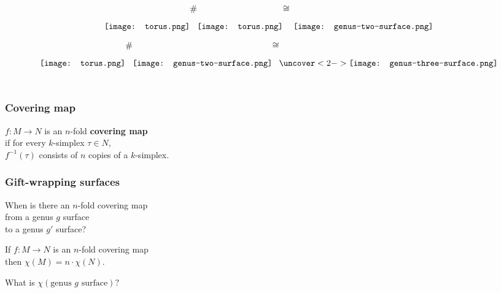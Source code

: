 \documentclass[14pt]{beamer}
\DeclareMathOperator{\st}{st}
\DeclareMathOperator{\cl}{cl}
\begin{document}
\begin{frame}
\vfill
$$
 \texttt{[image: torus.png]} \raisebox{0.06\textwidth}{$\#$}
 \texttt{[image: torus.png]}  \raisebox{0.06\textwidth}{$\cong$}
 \hspace{1ex}\texttt{[image: genus-two-surface.png]}
$$
\vfill
\end{frame}

\begin{frame}
\vfill
$$
 \texttt{[image: torus.png]} \raisebox{0.06\textwidth}{$\#$}
 \texttt{[image: genus-two-surface.png]}  \raisebox{0.06\textwidth}{$\cong$}
 \uncover<2->{\texttt{[image: genus-three-surface.png]}}
$$
\vfill
{}\\
\vspace{1ex}
\end{frame}

\begin{frame}
  \frametitle{Covering map}

  \begin{definition}
    $f : M \to N$ is an $n$-fold \textbf{covering map} \\
    if for every $k$-simplex $\tau \in N$, \\
    $f^{-1}(\tau)$ consists of $n$ copies of a $k$-simplex.
  \end{definition}

\end{frame}

\begin{frame}
  \frametitle{Gift-wrapping surfaces}

  \begin{problem}
    When is there an $n$-fold covering map \\
    from a genus $g$ surface \\
    to a genus $g'$ surface?
  \end{problem}
  \pause
  \begin{theorem}
    If $f : M \to N$ is an $n$-fold covering map \\
    then $\chi(M) = n \cdot \chi(N)$.
  \end{theorem}
  \pause
  \begin{problem}
    What is $\chi(\mbox{genus $g$ surface})?$
  \end{problem}

\end{frame}
\end{document}
